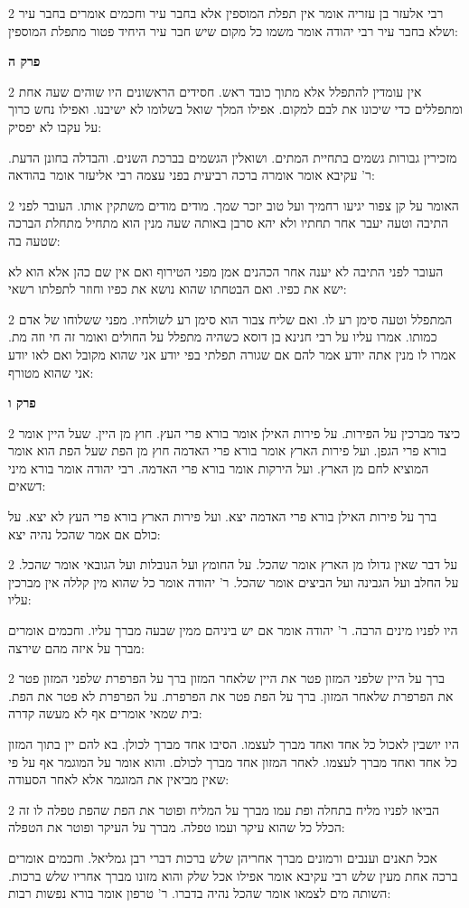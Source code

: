 \documentclass[12pt, openany]{book}
\newcommand{\sethebfont}{
\fontsize{10.5pt}{21.0pt} \selectfont
}
\newcommand{\twocol}[1]{
	{\sethebfont \begin{multicols}{2}
			#1
	\end{multicols}}	
}
\newcommand{\sectname}{}
\newcommand{\newsection}[1]{
	\addcontentsline{toc}{section}{#1}
	\renewcommand{\sectname}{#1}	
	\vspace{-\baselineskip}
	\begin{center}
		\textbf{%
\fontsize{16pt}{16pt}\selectfont
			#1}
	\end{center}
	\vspace{-\baselineskip}
	\nopagebreak
}
\begin{document}
\twocol{רבי אלעזר בן עזריה אומר אין תפלת המוספין אלא בחבר עיר וחכמים אומרים בחבר עיר ושלא בחבר עיר רבי יהודה אומר משמו כל מקום שיש חבר עיר היחיד פטור מתפלת המוספין: }
\newsection{פרק ה}
\twocol{אין עומדין להתפלל אלא מתוך כובד ראש. חסידים הראשונים היו שוהים שעה אחת ומתפללים כדי שיכונו את לבם למקום. אפילו המלך שואל בשלומו לא ישיבנו. ואפילו נחש כרוך על עקבו לא יפסיק: 
\par מזכירין גבורות גשמים בתחיית המתים. ושואלין הגשמים בברכת השנים. והבדלה בחונן הדעת. ר' עקיבא אומר אומרה ברכה רביעית בפני עצמה רבי אליעזר אומר בהודאה: }
\twocol{האומר על קן צפור יגיעו רחמיך ועל טוב יזכר שמך. מודים מודים משתקין אותו. העובר לפני התיבה וטעה יעבר אחר תחתיו ולא יהא סרבן באותה שעה מנין הוא מתחיל מתחלת הברכה שטעה בה: 
\par העובר לפני התיבה לא יענה אחר הכהנים אמן מפני הטירוף ואם אין שם כהן אלא הוא לא ישא את כפיו. ואם הבטחתו שהוא נושא את כפיו וחוזר לתפלתו רשאי: }
\twocol{המתפלל וטעה סימן רע לו. ואם שליח צבור הוא סימן רע לשולחיו. מפני ששלוחו של אדם כמותו. אמרו עליו על רבי חנינא בן דוסא כשהיה מתפלל על החולים ואומר זה חי וזה מת. אמרו לו מנין אתה יודע אמר להם אם שגורה תפלתי בפי יודע אני שהוא מקובל ואם לאו יודע אני שהוא מטורף: }
\newsection{פרק ו}
\twocol{כיצד מברכין על הפירות. על פירות האילן אומר בורא פרי העץ. חוץ מן היין. שעל היין אומר בורא פרי הגפן. ועל פירות הארץ אומר בורא פרי האדמה חוץ מן הפת שעל הפת הוא אומר המוציא לחם מן הארץ. ועל הירקות אומר בורא פרי האדמה. רבי יהודה אומר בורא מיני דשאים: 
\par ברך על פירות האילן בורא פרי האדמה יצא. ועל פירות הארץ בורא פרי העץ לא יצא. על כולם אם אמר שהכל נהיה יצא: }
\twocol{על דבר שאין גדולו מן הארץ אומר שהכל. על החומץ ועל הנובלות ועל הגובאי אומר שהכל. על החלב ועל הגבינה ועל הביצים אומר שהכל. ר' יהודה אומר כל שהוא מין קללה אין מברכין עליו: 
\par היו לפניו מינים הרבה. ר' יהודה אומר אם יש ביניהם ממין שבעה מברך עליו. וחכמים אומרים מברך על איזה מהם שירצה: }
\twocol{ברך על היין שלפני המזון פטר את היין שלאחר המזון ברך על הפרפרת שלפני המזון פטר את הפרפרת שלאחר המזון. ברך על הפת פטר את הפרפרת. על הפרפרת לא פטר את הפת. בית שמאי אומרים אף לא מעשה קדרה: 
\par היו יושבין לאכול כל אחד ואחד מברך לעצמו. הסיבו אחד מברך לכולן. בא להם יין בתוך המזון כל אחד ואחד מברך לעצמו. לאחר המזון אחד מברך לכולם. והוא אומר על המוגמר אף על פי שאין מביאין את המוגמר אלא לאחר הסעודה: }
\twocol{הביאו לפניו מליח בתחלה ופת עמו מברך על המליח ופוטר את הפת שהפת טפלה לו זה הכלל כל שהוא עיקר ועמו טפלה. מברך על העיקר ופוטר את הטפלה: 
\par אכל תאנים וענבים ורמונים מברך אחריהן שלש ברכות דברי רבן גמליאל. וחכמים אומרים ברכה אחת מעין שלש רבי עקיבא אומר אפילו אכל שלק והוא מזונו מברך אחריו שלש ברכות. השותה מים לצמאו אומר שהכל נהיה בדברו. ר' טרפון אומר בורא נפשות רבות: }
\end{document}
